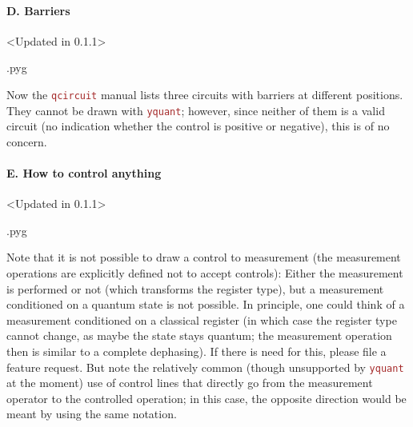 \documentclass{scrartcl}
\makeatletter
\newenvironment{codeexample}{%
   \VerbatimEnvironment%
   \let\FVB@VerbatimOut\minted@FVB@VerbatimOut
   \let\FVE@VerbatimOut\minted@FVE@VerbatimOut
   \minted@configlang{tex}%
   \minted@fvset
   \begin{VerbatimOut}[codes={\catcode`\^^I=12},firstline,lastline]{\minted@jobname.pyg}%
}{
   \end{VerbatimOut}%
   \minted@langlinenoson%
   \savebox\codeexamplebox{ \minted@jobname.pyg}%
   \ifdim\wd\codeexamplebox>\dimexpr.5\linewidth-3mm\relax%
      \wd\codeexamplebox=.5\linewidth%
   \else%
      \wd\codeexamplebox=\dimexpr\wd\codeexamplebox+3mm\relax%
   \fi%
   \noindent\begin{minipage}{\wd\codeexamplebox}%
      \centering%
      \usebox\codeexamplebox%
   \end{minipage}%
   \begin{minipage}{\dimexpr\linewidth-\wd\codeexamplebox\relax}%
      \minted@pygmentize{\minted@lang}%
   \end{minipage}%
   \minted@langlinenosoff%
   \par%
}
\def\pkg#1{\textcolor{brown}{\texttt{#1}}}
\def\Yquant{\pkg{yquant}}
\makeatother
\begin{document}
            \paragraph{D. Barriers}\leavevmode
               \begin{example}<Updated in 0.1.1>
                  \begin{codeexample}
                  \end{codeexample}
               \end{example}
               Now the \pkg{qcircuit} manual lists three circuits with barriers at different positions.
               They cannot be drawn with \Yquant; however, since neither of them is a valid circuit (no indication whether the control is positive or negative), this is of no concern.

            \paragraph{E. How to control anything}\leavevmode
               \begin{example}<Updated in 0.1.1>
                  \begin{codeexample}
                  \end{codeexample}
                  Note that it is not possible to draw a control to measurement (the measurement operations are explicitly defined not to accept controls): Either the measurement is performed or not (which transforms the register type), but a measurement conditioned on a quantum state is not possible.
                  In principle, one could think of a measurement conditioned on a classical register (in which case the register type cannot change, as maybe the state stays quantum; the measurement operation then is similar to a complete dephasing).
                  If there is need for this, please file a feature request.
                  But note the relatively common (though unsupported by \Yquant{} at the moment) use of control lines that directly go from the measurement operator to the controlled operation; in this case, the opposite direction would be meant by using the same notation.
               \end{example}
\end{document}
